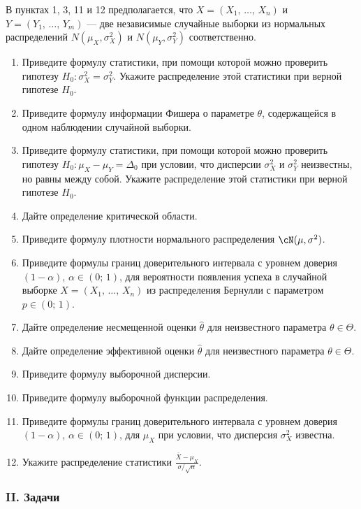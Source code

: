 В пунктах 1, 3, 11 и 12 предполагается, что $X = (X_1, \, \ldots, \, X_n)$ и $Y = (Y_1, \, \ldots, \, Y_m)$ — две независимые случайные выборки из нормальных распределений $N(\mu_X, \sigma_X^2)$ и $N(\mu_Y, \sigma_Y^2)$ соответственно.

\begin{enumerate}
  \item Приведите формулу статистики, при помощи которой можно проверить гипотезу $H_0 \colon \sigma_X^2 = \sigma_Y^2$. Укажите распределение этой статистики при верной гипотезе $H_0$.
  \item Приведите формулу информации Фишера о параметре $\theta$, содержащейся в одном наблюдении случайной выборки.
  \item Приведите формулу статистики, при помощи которой можно проверить гипотезу $H_0 \colon \mu_X - \mu_Y = \Delta_0$ при условии, что дисперсии $\sigma_X^2$ и $\sigma_Y^2$ неизвестны, но равны между собой. Укажите распределение этой статистики при верной гипотезе $H_0$.
  \item Дайте определение критической области.
  \item Приведите формулу плотности нормального распределения $\cN(\mu, \sigma^2)$.
  \item Приведите формулы границ доверительного интервала с уровнем доверия $(1 - \alpha)$, $\alpha \in (0;\,1)$, для вероятности появления успеха в случайной выборке $X = (X_1, \, \ldots, \, X_n)$ из распределения Бернулли с параметром $p \in (0;\,1)$.
  \item Дайте определение несмещенной оценки $\hat{\theta}$ для неизвестного параметра $\theta \in \Theta$.
  \item Дайте определение эффективной оценки $\hat{\theta}$ для неизвестного параметра $\theta \in \Theta$.
  \item Приведите формулу выборочной дисперсии.
  \item Приведите формулу выборочной функции распределения.
  \item Приведите формулы границ доверительного интервала с уровнем доверия $(1 - \alpha)$, $\alpha \in (0;\,1)$, для $\mu_X$ при условии, что дисперсия $\sigma_X^2$ известна.
  \item Укажите распределение статистики $\frac{\overline{X} - \mu_X}{\sigma / \sqrt{n}}$.
\end{enumerate}


\subsubsection*{II. Задачи}

